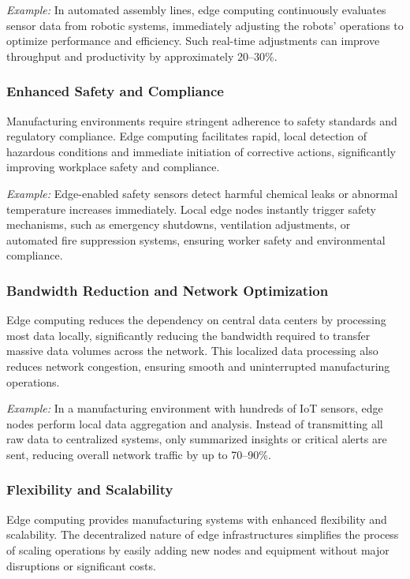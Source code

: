\documentclass[runningheads]{llncs}
\begin{document}
\noindent\textit{Example:} In automated assembly lines, edge computing continuously evaluates sensor data from robotic systems, immediately adjusting the robots' operations to optimize performance and efficiency. Such real-time adjustments can improve throughput and productivity by approximately 20–30\%.

\subsubsection{Enhanced Safety and Compliance}
Manufacturing environments require stringent adherence to safety standards and regulatory compliance. Edge computing facilitates rapid, local detection of hazardous conditions and immediate initiation of corrective actions, significantly improving workplace safety and compliance.

\noindent\textit{Example:} Edge-enabled safety sensors detect harmful chemical leaks or abnormal temperature increases immediately. Local edge nodes instantly trigger safety mechanisms, such as emergency shutdowns, ventilation adjustments, or automated fire suppression systems, ensuring worker safety and environmental compliance.

\subsubsection{Bandwidth Reduction and Network Optimization}
Edge computing reduces the dependency on central data centers by processing most data locally, significantly reducing the bandwidth required to transfer massive data volumes across the network. This localized data processing also reduces network congestion, ensuring smooth and uninterrupted manufacturing operations.

\noindent\textit{Example:} In a manufacturing environment with hundreds of IoT sensors, edge nodes perform local data aggregation and analysis. Instead of transmitting all raw data to centralized systems, only summarized insights or critical alerts are sent, reducing overall network traffic by up to 70–90\%.

\subsubsection{Flexibility and Scalability}
Edge computing provides manufacturing systems with enhanced flexibility and scalability. The decentralized nature of edge infrastructures simplifies the process of scaling operations by easily adding new nodes and equipment without major disruptions or significant costs.
\end{document}
